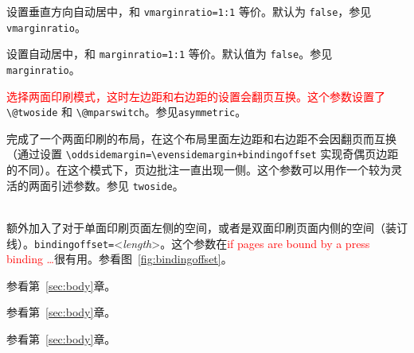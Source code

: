\documentclass[titlepage]{ctexart}
\newenvironment{Options}%
  {\begin{list}{}{%
   \renewcommand{\makelabel}[1]{\texttt{##1}\hfil}%
   \setlength{\itemsep}{-.5\parsep}
   \settowidth{\labelwidth}{\texttt{xxxxxxxxxxx\space}}%
   \setlength{\leftmargin}{\labelwidth}%
   \addtolength{\leftmargin}{\labelsep}}%
   \raggedright}
  {\end{list}}
\begin{document}
\begin{Options}
	  \item[vcentering] 设置垂直方向自动居中，和 \verb|vmarginratio=1:1| 等价。默认为 \verb|false|，参见 \verb|vmarginratio|。
	  \item[centering] 设置自动居中，和 \verb|marginratio=1:1| 等价。默认值为 \verb|false|。参见 \verb|marginratio|。
	  \item[twoside] \textcolor{red}{选择两面印刷模式，这时左边距和右边距的设置会翻页互换。这个参数设置了} \verb|\@twoside| 和 \verb|\@mparswitch|。参见\verb|asymmetric|。
	  \item[asymmetric] 完成了一个两面印刷的布局，在这个布局里面左边距和右边距不会因翻页而互换（通过设置 \verb|\oddsidemargin=|\verb|\evensidemargin+bindingoffset| 实现奇偶页边距的不同）。在这个模式下，页边批注一直出现一侧。这个参数可以用作一个较为灵活的两面引述参数。参见 \verb|twoside|。
	  \item[bindingoffset]~\\
	  额外加入了对于单面印刷页面左侧的空间，或者是双面印刷页面内侧的空间（装订线）。\verb|bindingoffset=|<\emph{length}>。这个参数在\textcolor{red}{if pages are bound by a press binding \ldots}很有用。参看图~\ref{fig:bindingoffset}。
	  \item[hdivide] 参看第~\ref{sec:body}章。
	  \item[vdivide] 参看第~\ref{sec:body}章。
	  \item[divide] 参看第~\ref{sec:body}章。  
	 \end{Options}
\end{document}
